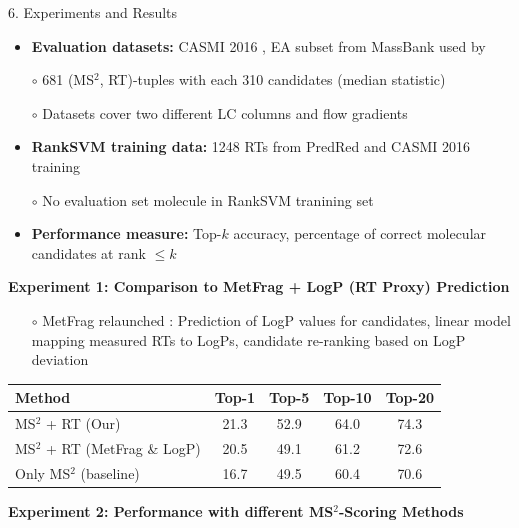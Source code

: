 \documentclass{beamer}
\newcommand{\ms}{MS}
\newcommand{\lc}{LC}
\newcommand{\msms}{\ms$^2$}
\begin{document}
\begin{frame}{}
\begin{columns}[T]
\hfill
{} 

    \begin{block}{{\normalsize 6. Experiments and Results}}
    \begin{itemize}
        \item \textbf{Evaluation datasets:} CASMI 2016 \cite{Schymanski2017}, EA subset from MassBank used by \cite{Ruttkies2016} 
        \item[$\circ$] 681 (\msms, RT)-tuples with each 310 candidates (median statistic)
        \item[$\circ$] Datasets cover two different \lc{} columns and flow gradients
        \item \textbf{RankSVM training data:} 1248 RTs from PredRed \cite{Stanstrup2015} and CASMI 2016 training
        \item[$\circ$] No evaluation set molecule in RankSVM tranining set
        \item \textbf{Performance measure:} Top-$k$ accuracy, percentage of correct molecular candidates at rank $\leq k$
    \end{itemize}
    \vspace{0.5cm}
    \textbf{Experiment 1: Comparison to MetFrag + LogP (RT Proxy) Prediction}
    \begin{itemize}
        \item[$\circ$] MetFrag relaunched \cite{Ruttkies2016}: Prediction of LogP values for candidates, linear model mapping measured RTs to LogPs, candidate re-ranking based on LogP deviation
    \end{itemize}
        \begin{table}
            \centering
            \begin{tabular}{lcccc}
                \toprule
                \textbf{Method} & \textbf{Top-1} & \textbf{Top-5} & \textbf{Top-10} & \textbf{Top-20} \\ \midrule
                \msms{} + RT (Our) & 21.3 & 52.9 & 64.0 & 74.3 \\
                \msms{} + RT (MetFrag \& LogP) & 20.5 & 49.1 & 61.2 & 72.6 \\ \cmidrule(lr){1-5}
                Only \msms{} (baseline) & 16.7 & 49.5 & 60.4 & 70.6 \\
                \bottomrule
            \end{tabular}
        \end{table}
    \vspace{1cm}
    \textbf{Experiment 2: Performance with different \msms{}-Scoring Methods}

\end{block}
\end{columns}
\end{frame}
\end{document}
